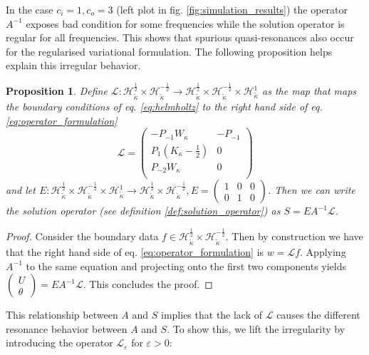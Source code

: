 \documentclass[12pt,journal,compsoc, onecolumn]{IEEEtran}
\newtheorem{proposition}[theorem]{Proposition}
\begin{document}
\noindent In the case $c_i = 1, c_o = 3$ (left plot in fig. \ref{fig:simulation_results}) the operator $A^{-1}$ exposes bad condition for some frequencies while the solution operator is regular for all frequencies. This shows that spurious quasi-resonances also occur for the regularised variational formulation. The following proposition helps explain this irregular behavior.
\newpage
\begin{proposition}
Define
    $\mathcal{L}: \mathcal{H}_{\tilde \kappa}^{\frac{1}{2}} \times \mathcal{H}_{\tilde \kappa}^{-\frac{1}{2}} \rightarrow \mathcal{H}_{\tilde \kappa}^{\frac{1}{2}} \times \mathcal{H}_{\tilde \kappa}^{-\frac{1}{2}} \times \mathcal{H}_{\tilde \kappa}^{1}$ as the map that maps the boundary conditions of eq. \ref{eq:helmholtz} to the right hand side of eq. \ref{eq:operator_formulation}
    $$
        \mathcal{L} = 
        \begin{pmatrix}
            -P_{-1}W_{\kappa} & -P_{-1} \\
            P_{1}(K_{\kappa} - \frac{1}{2}) & 0 \\
            P_{-2}W_{\kappa} & 0 \\
        \end{pmatrix}
    $$
and let
 ${E}: \mathcal{H}_{\tilde{\kappa}}^{\frac{1}{2}} \times \mathcal{H}_{\tilde{\kappa}}^{-\frac{1}{2}} \times \mathcal{H}_{\tilde{\kappa}}^{1} \rightarrow \mathcal{H}_{\tilde{\kappa}}^{\frac{1}{2}} \times \mathcal{H}_{\tilde{\kappa}}^{-\frac{1}{2}}, {E} = \begin{pmatrix}
    1 & 0 & 0 \\
    0 & 1 & 0 
\end{pmatrix}$.
    Then we can write the solution operator (see definition \ref{def:solution_operator}) as 
    $S = 
    {E}
    A^{-1} \mathcal{L}
    $.
\end{proposition}
\begin{proof}
    Consider the boundary data $f \in \mathcal{H}_{\tilde \kappa}^{\frac{1}{2}} \times \mathcal{H}_{\tilde \kappa}^{-\frac{1}{2}}$. Then by construction we have that the right hand side of eq. \ref{eq:operator_formulation} is $w = \mathcal{L} f$. Applying $A^{-1}$ to the same equation and projecting onto the first two components yields $\begin{pmatrix} U \\ \theta  \end{pmatrix} = {E}A^{-1} \mathcal{L}$. This concludes the proof.
\end{proof}  \noindent
This relationship between $A$ and $S$ implies that the lack of  $\mathcal{L}$ causes the different resonance behavior between $A$ and $S$. To show this, we lift the irregularity by introducing the operator $\mathcal{L}_\varepsilon$ for $\varepsilon > 0$: 
\end{document}
